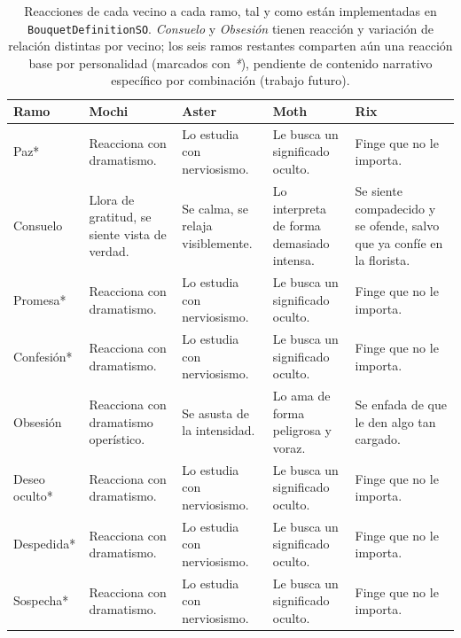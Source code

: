\documentclass[12pt,twoside,titlepage]{report}
\begin{document}
\begin{table}
  \centering
  \caption{Reacciones de cada vecino a cada ramo, tal y como están implementadas en \texttt{BouquetDefinitionSO}. \textit{Consuelo} y \textit{Obsesión} tienen reacción y variación de relación distintas por vecino; los seis ramos restantes comparten aún una reacción base por personalidad (marcados con \textit{*}), pendiente de contenido narrativo específico por combinación (trabajo futuro).}
  \label{tab:reacciones_ramos}
  \begin{footnotesize}
  \renewcommand{\arraystretch}{1.4}
  \begin{tabular}{p{2.6cm}p{3.4cm}p{3.4cm}p{3.6cm}p{3.8cm}}
    \hline
    \textbf{Ramo} & \textbf{Mochi} & \textbf{Aster} & \textbf{Moth} & \textbf{Rix} \\
    \hline
    Paz* & Reacciona con dramatismo. & Lo estudia con nerviosismo. & Le busca un significado oculto. & Finge que no le importa. \\
    \hline
    Consuelo & Llora de gratitud, se siente vista de verdad. & Se calma, se relaja visiblemente. & Lo interpreta de forma demasiado intensa. & Se siente compadecido y se ofende, salvo que ya confíe en la florista. \\
    \hline
    Promesa* & Reacciona con dramatismo. & Lo estudia con nerviosismo. & Le busca un significado oculto. & Finge que no le importa. \\
    \hline
    Confesión* & Reacciona con dramatismo. & Lo estudia con nerviosismo. & Le busca un significado oculto. & Finge que no le importa. \\
    \hline
    Obsesión & Reacciona con dramatismo operístico. & Se asusta de la intensidad. & Lo ama de forma peligrosa y voraz. & Se enfada de que le den algo tan cargado. \\
    \hline
    Deseo oculto* & Reacciona con dramatismo. & Lo estudia con nerviosismo. & Le busca un significado oculto. & Finge que no le importa. \\
    \hline
    Despedida* & Reacciona con dramatismo. & Lo estudia con nerviosismo. & Le busca un significado oculto. & Finge que no le importa. \\
    \hline
    Sospecha* & Reacciona con dramatismo. & Lo estudia con nerviosismo. & Le busca un significado oculto. & Finge que no le importa. \\
    \hline
  \end{tabular}
  \end{footnotesize}
\end{table}
\end{document}
